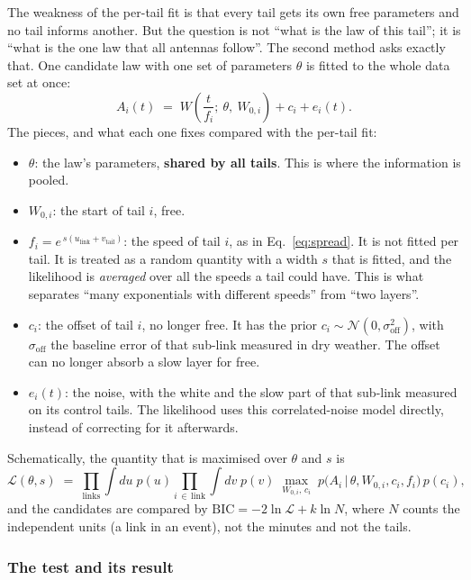 \documentclass[11pt,a4paper]{article}
\begin{document}
The weakness of the per-tail fit is that every tail gets its own free parameters and no tail informs another. But the
question is not ``what is the law of this tail''; it is ``what is the one law that all antennas follow''. The second
method asks exactly that. One candidate law with one set of parameters $\theta$ is fitted to the whole data set at
once:
\begin{equation}
A_{i}(t) \;=\; W\!\left(\frac{t}{f_{i}};\ \theta,\ W_{0,i}\right) + c_{i} + e_{i}(t) .
\label{eq:pooled}
\end{equation}
The pieces, and what each one fixes compared with the per-tail fit:
\begin{itemize}
\item $\theta$: the law's parameters, \textbf{shared by all tails}. This is where the information is pooled.
\item $W_{0,i}$: the start of tail $i$, free.
\item $f_{i} = e^{\,s(u_{\text{link}} + v_{\text{tail}})}$: the speed of tail $i$, as in Eq.~\eqref{eq:spread}. It is
not fitted per tail. It is treated as a random quantity with a width $s$ that is fitted, and the likelihood is
\emph{averaged} over all the speeds a tail could have. This is what separates ``many exponentials with different
speeds'' from ``two layers''.
\item $c_{i}$: the offset of tail $i$, no longer free. It has the prior
$c_{i} \sim \mathcal{N}(0, \sigma_{\mathrm{off}}^{2})$, with $\sigma_{\mathrm{off}}$ the baseline error of that
sub-link measured in dry weather. The offset can no longer absorb a slow layer for free.
\item $e_{i}(t)$: the noise, with the white and the slow part of that sub-link measured on its control tails. The
likelihood uses this correlated-noise model directly, instead of correcting for it afterwards.
\end{itemize}
Schematically, the quantity that is maximised over $\theta$ and $s$ is
\begin{equation}
\mathcal{L}(\theta, s) \;=\; \prod_{\text{links}} \int\! du\; p(u) \prod_{i \,\in\, \text{link}} \int\! dv\; p(v)\;
\max_{W_{0,i},\,c_{i}}\; p\bigl(A_{i} \,\big|\, \theta, W_{0,i}, c_{i}, f_{i}\bigr)\,p(c_{i}),
\end{equation}
and the candidates are compared by $\mathrm{BIC} = -2\ln\mathcal{L} + k\ln N$, where $N$ counts the independent units (a link in an event), not the minutes and not the tails.

\subsubsection*{The test and its result}
\end{document}
